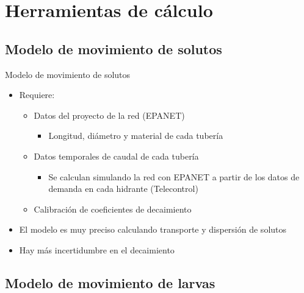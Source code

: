 \documentclass[pdr]{beamer}
\begin{document}
\section{Herramientas de cálculo}

\subsection{Modelo de movimiento de solutos}

\begin{frame}{Modelo de movimiento de solutos}
	\begin{itemize}
		\item Requiere:
		\begin{itemize}
			\item Datos del proyecto de la red (EPANET)
			\begin{itemize}
				\item Longitud, diámetro y material de cada
					tubería
			\end{itemize}
			\item Datos temporales de caudal de cada tubería
			\begin{itemize}
				\item Se calculan simulando la red con EPANET a
					partir de los datos de demanda en cada
					hidrante (Telecontrol)
			\end{itemize}
			\item Calibración de coeficientes de decaimiento
		\end{itemize}
		\item El modelo es muy preciso calculando transporte y
			dispersión de solutos
		\item Hay más incertidumbre en el decaimiento 
	\end{itemize}
\end{frame}

\subsection{Modelo de movimiento de larvas}
\end{document}
